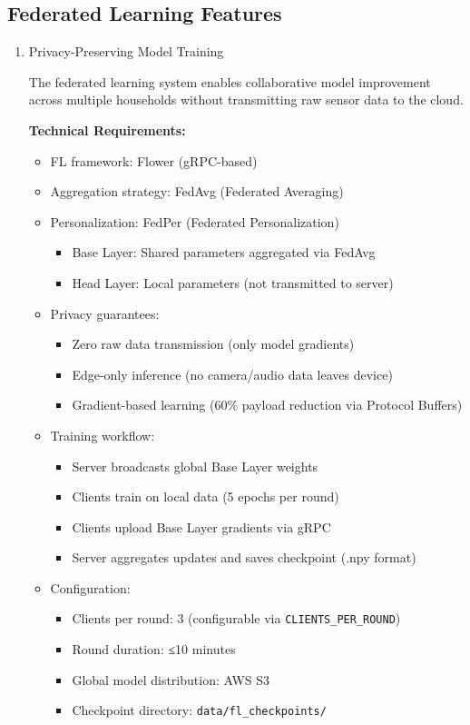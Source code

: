 \documentclass[conference]{IEEEtran}
\begin{document}
\subsection{Federated Learning Features}

\begin{enumerate}
    \item[1.] Privacy-Preserving Model Training

The federated learning system enables collaborative model improvement across multiple households without transmitting raw sensor data to the cloud.

\textbf{Technical Requirements:}
\begin{itemize}
    \item FL framework: Flower (gRPC-based)
    \item Aggregation strategy: FedAvg (Federated Averaging)
    \item Personalization: FedPer (Federated Personalization)
    \begin{itemize}
        \item Base Layer: Shared parameters aggregated via FedAvg
        \item Head Layer: Local parameters (not transmitted to server)
    \end{itemize}
    \item Privacy guarantees:
    \begin{itemize}
        \item Zero raw data transmission (only model gradients)
        \item Edge-only inference (no camera/audio data leaves device)
        \item Gradient-based learning (60\% payload reduction via Protocol Buffers)
    \end{itemize}
    \item Training workflow:
    \begin{itemize}
        \item Server broadcasts global Base Layer weights
        \item Clients train on local data (5 epochs per round)
        \item Clients upload Base Layer gradients via gRPC
        \item Server aggregates updates and saves checkpoint (.npy format)
    \end{itemize}
    \item Configuration:
    \begin{itemize}
        \item Clients per round: 3 (configurable via \texttt{CLIENTS\_PER\_ROUND})
        \item Round duration: ≤10 minutes
        \item Global model distribution: AWS S3
        \item Checkpoint directory: \texttt{data/fl\_checkpoints/}
    \end{itemize}
\end{itemize}

\end{enumerate}
\end{document}
